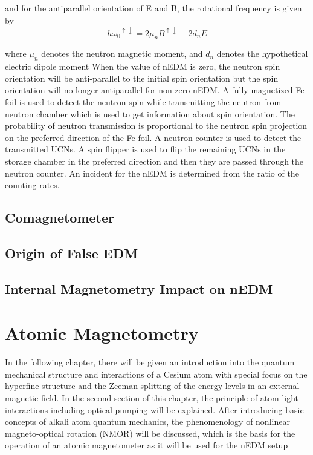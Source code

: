 \documentclass[12pt]{report}
\begin{document}
and for the antiparallel orientation of E and B, the rotational frequency is given by
\begin{equation}\label{my_first_eqn}  
    h{\omega_0}^ {\uparrow\downarrow}=2\mu_n {B}^{\uparrow\downarrow}- 2 d_nE
\end{equation}

where $\mu_n$ denotes the neutron magnetic moment, and $d_n$ denotes the hypothetical electric dipole moment
When the value of nEDM is zero, the neutron spin orientation will be anti-parallel to the initial spin orientation but the spin orientation will no longer antiparallel for non-zero nEDM. A fully magnetized Fe-foil is used to detect the neutron spin while transmitting the neutron from neutron chamber which is used to get information about spin orientation. The probability of neutron transmission is proportional to the neutron spin projection on the preferred direction of the Fe-foil. A neutron counter is used to detect the transmitted UCNs. A spin flipper is used to flip the remaining UCNs in the storage chamber in the preferred direction and then they are passed through the neutron counter. An incident for the nEDM is determined from the ratio of the counting rates.
\section{Comagnetometer}
\section{Origin of False EDM}
\section{Internal Magnetometry Impact on nEDM}
\newpage
\LARGE
\chapter{Atomic Magnetometry}
\small

 In the following chapter, there will be given an introduction into the quantum mechanical
structure and interactions of a Cesium atom with special focus on the hyperfine structure and the Zeeman splitting of the energy levels in an external magnetic field. In the second section of this chapter, the principle of atom-light interactions including optical pumping
will be explained. After introducing basic concepts of alkali atom quantum mechanics, the phenomenology of nonlinear magneto-optical rotation (NMOR) will be discussed, which is the basis for the operation of an atomic magnetometer as it will be used for the nEDM setup
\end{document}
